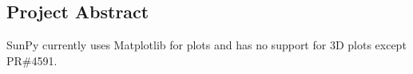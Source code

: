 \subsection{Project Abstract}
SunPy currently uses Matplotlib for plots and has no support for 3D plots except PR\#4591.
